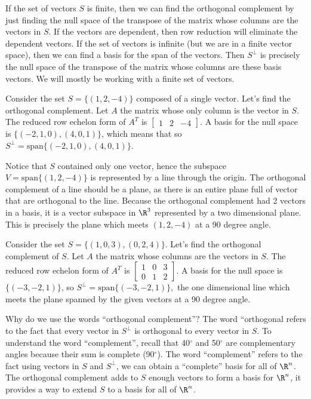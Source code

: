 If the set of vectors $S$ is finite, then we can find the orthogonal complement by just finding the null space of the transpose of the matrix whose columns are the vectors in $S$. 
If the vectors are dependent, then row reduction will eliminate the dependent vectors. 
If the set of vectors is infinite (but we are in a finite vector space), then we can find a basis for the span of the vectors. 
Then $S^\perp$ is precisely the null space of the transpose of the matrix whose columns are these basis vectors.  
We will mostly be working with a finite set of vectors.

\begin{example}
Consider the set  $S=\{(1,2,-4)\}$ composed of a single vector. Let's find the orthogonal complement.
Let $A$ the matrix whose only column is the vector in $S$. 
The reduced row echelon form of $A^T$ is $\begin{bmatrix}1&2&-4\end{bmatrix}$. 
A basis for the null space is $\{(-2,1,0), (4,0,1)\}$, which means that so $S^\perp = \text{span}\{(-2,1,0), (4,0,1)\}$. 

Notice that $S$ contained only one vector, hence the subspace $V = \text{span}\{(1,2,-4)\}$ is represented by a line through the origin. 
The orthogonal complement of a line should be a plane, as there is an entire plane full of vector that are orthogonal to the line.  
Because the orthogonal complement had 2 vectors in a basis, it is a vector subspace in $\R^3$ represented by a two dimensional plane. This is precisely the plane which meets $(1,2,-4)$ at a 90 degree angle.  
\end{example}


\begin{example}
Consider the set  $S=\{(1,0,3),(0,2,4)\}$. Let's find the orthogonal complement of $S$.
Let $A$ the matrix whose columns are the vectors in $S$. The reduced row echelon form of $A^T$ is $\begin{bmatrix}1&0&3\\0&1&2\end{bmatrix}$. A basis for the null space is $\{(-3,-2,1)\}$, so $S^\perp = \text{span}\{(-3,-2,1)\},$ the one dimensional line which meets the plane spanned by the given vectors at a 90 degree angle.
\end{example}

Why do we use the words ``orthogonal complement''? The word ``orthogonal refers to the fact that every vector in $S^\perp$ is orthogonal to every vector in $S$.  To understand the word ``complement'', recall that 40$^\circ$ and 50$^\circ$ are complementary angles because their sum is complete (90$^\circ$).  The word ``complement'' refers to the fact using vectors in $S$ and $S^\perp$, we can obtain a ``complete'' basis for all of $\R^n$.  The orthogonal complement adds to $S$ enough vectors to form a basis for $\R^n$, it provides a way to extend $S$ to a basis for all of $\R^n$.



